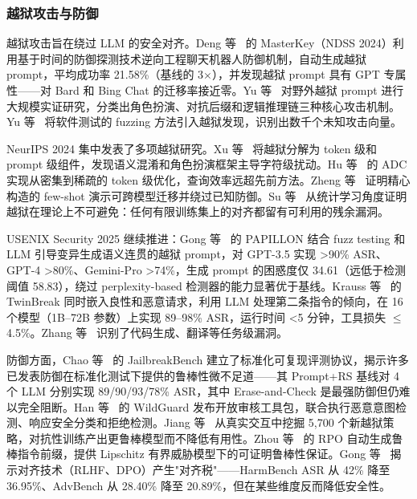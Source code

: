\documentclass[11pt,a4paper,onecolumn]{article}
\begin{document}
\subsubsection{越狱攻击与防御}
越狱攻击旨在绕过 LLM 的安全对齐。Deng 等~\cite{deng2024masterkey} 的 MasterKey（NDSS 2024）利用基于时间的防御探测技术逆向工程聊天机器人防御机制，自动生成越狱 prompt，平均成功率 21.58\%（基线的 3$\times$），并发现越狱 prompt 具有 GPT 专属性——对 Bard 和 Bing Chat 的迁移率接近零。Yu 等~\cite{yu2024dontlisten} 对野外越狱 prompt 进行大规模实证研究，分类出角色扮演、对抗后缀和逻辑推理链三种核心攻击机制。Yu 等~\cite{yu2024fuzzer} 将软件测试的 fuzzing 方法引入越狱发现，识别出数千个未知攻击向量。

NeurIPS 2024 集中发表了多项越狱研究。Xu 等~\cite{xu2024bagoftricks} 将越狱分解为 token 级和 prompt 级组件，发现语义混淆和角色扮演框架主导字符级扰动。Hu 等~\cite{hu2024adc} 的 ADC 实现从密集到稀疏的 token 级优化，查询效率远超先前方法。Zheng 等~\cite{zheng2024fewshot} 证明精心构造的 few-shot 演示可跨模型迁移并绕过已知防御。Su 等~\cite{su2024missionimpossible} 从统计学习角度证明越狱在理论上不可避免：任何有限训练集上的对齐都留有可利用的残余漏洞。

USENIX Security 2025 继续推进：Gong 等~\cite{gong2025papillon} 的 PAPILLON 结合 fuzz testing 和 LLM 引导变异生成语义连贯的越狱 prompt，对 GPT-3.5 实现 >90\% ASR、GPT-4 >80\%、Gemini-Pro >74\%，生成 prompt 的困惑度仅 34.61（远低于检测阈值 58.83），绕过 perplexity-based 检测器的能力显著优于基线。Krauss 等~\cite{krauss2025twinbreak} 的 TwinBreak 同时嵌入良性和恶意请求，利用 LLM 处理第二条指令的倾向，在 16 个模型（1B--72B 参数）上实现 89--98\% ASR，运行时间 <5 分钟，工具损失 $\leq$4.5\%。Zhang 等~\cite{zhang2025tasklevel} 识别了代码生成、翻译等任务级漏洞。

防御方面，Chao 等~\cite{chao2024jailbreakbench} 的 JailbreakBench 建立了标准化可复现评测协议，揭示许多已发表防御在标准化测试下提供的鲁棒性微不足道——其 Prompt+RS 基线对 4 个 LLM 分别实现 89/90/93/78\% ASR，其中 Erase-and-Check 是最强防御但仍难以完全阻断。Han 等~\cite{han2024wildguard} 的 WildGuard 发布开放审核工具包，联合执行恶意意图检测、响应安全分类和拒绝检测。Jiang 等~\cite{jiang2024wildteaming} 从真实交互中挖掘 5,700 个新越狱策略，对抗性训练产出更鲁棒模型而不降低有用性。Zhou 等~\cite{zhou2024rpo} 的 RPO 自动生成鲁棒指令前缀，提供 Lipschitz 有界威胁模型下的可证明鲁棒性保证。Gong 等~\cite{gong2025safetyMisalign} 揭示对齐技术（RLHF、DPO）产生"对齐税"——HarmBench ASR 从 42\% 降至 36.95\%、AdvBench 从 28.40\% 降至 20.89\%，但在某些维度反而降低安全性。
\end{document}
